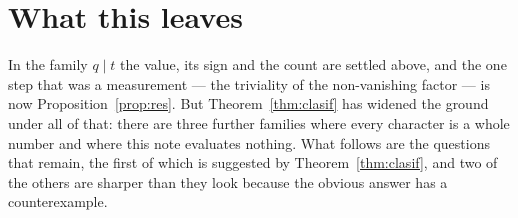 \documentclass[11pt,a4paper]{article}
\theoremstyle{definition}
\begin{document}
\section{What this leaves}\label{sec:preguntas}

In the family $q\mid t$ the value, its sign and the count are settled above, and the one step
that was a measurement --- the triviality of the non-vanishing factor --- is now
Proposition~\ref{prop:res}. But Theorem~\ref{thm:clasif} has widened the ground under all of
that: there are three further families where every character is a whole number and where this
note evaluates nothing. What follows are the questions that remain, the first of which is suggested
by Theorem~\ref{thm:clasif}, and two of the others are sharper than they look because the
obvious answer has a counterexample.
\end{document}
